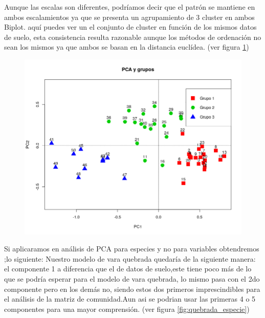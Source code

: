 \documentclass[11pt,]{article}
\begin{document}
Aunque las escalas son diferentes, podríamos decir que el patrón se
mantiene en ambos escalamientos ya que se presenta un agrupamiento de 3
cluster en ambos Biplot. aquí puedes ver un el conjunto de cluster en
función de los mismos datos de suelo, esta consistencia resulta
razonable aunque los métodos de ordenación no sean los mismos ya que
ambos se basan en la distancia euclídea. (ver figura
\ref{fig:cluster_pca})

\begin{figure}
\centering
\includegraphics{cluster_pca.png}
\caption{\label{fig:cluster_pca}}
\end{figure}

Si aplicaramos en análisis de PCA para especies y no para variables
obtendremos ;lo siguiente: Nuestro modelo de vara quebrada quedaría de
la siguiente manera: el componente 1 a diferencia que el de datos de
suelo,este tiene poco más de lo que se podría esperar para el modelo de
vara quebrada, lo mismo pasa con el 2do componente pero en los demás no,
siendo estos dos primeros imprescindibles para el análisis de la matriz
de comunidad.Aun asi se podrian usar las primeras 4 o 5 componentes para
una mayor comprensión. (ver figura \ref{fig:quebrada_especie})
\end{document}
